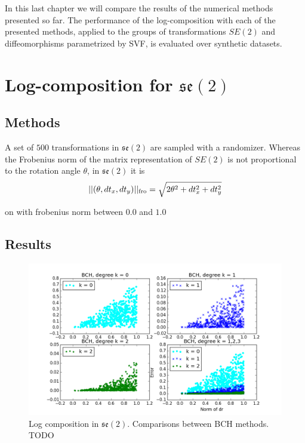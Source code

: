 In this last chapter we will compare the results of the numerical methods presented so far.
The performance of the log-composition with each of the presented methods, applied to the groups of transformations $SE(2)$ and diffeomorphisms parametrized by SVF, is evaluated over synthetic datasets.

\section{Log-composition for $\mathfrak{se}(2)$}



\subsection{Methods}

A set of $500$ transformations in $\mathfrak{se}(2)$ are sampled with a randomizer. Whereas the Frobenius norm of the matrix representation of $SE(2)$ is not proportional to the rotation angle $\theta$, in $\mathfrak{se}(2)$ it is
\begin{align*}
\vert\lvert (\theta,dt_{x},dt_{y}) \rvert\vert_{\text{fro}} = \sqrt{2\theta^{2} + dt_{x}^2 + dt_{y}^2} 
\end{align*}




on with frobenius norm between $0.0$ and $1.0$


\subsection{Results}


\begin{figure}[!ht]
	\hspace{-1cm}
	\includegraphics[scale=0.65]{figures/se2_four_BCH.png}
	\caption{Log composition in $\mathfrak{se}(2)$. Comparisons between BCH methods. TODO}
	\label{fig:se2_four_BCH}
\end{figure}

